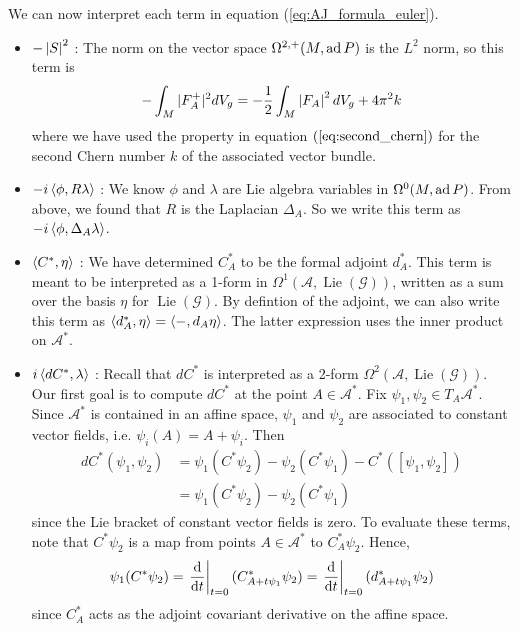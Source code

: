 We can now interpret each term in equation (\ref{eq:AJ_formula_euler}).
\begin{itemize}[leftmargin=\parindent]
    \item 
$-\abs{S}^2$ : The norm on the vector space $\Omega^{2,+}(M,\operatorname{ad} P)$ is the 
$L^2$ norm, so this term is 
\[
	-\int_M \abs[*]{F^+_A}^2 dV_g = -\frac{1}{2}\int_M \abs{F_A}^2 dV_g + 4\pi^2k
\] 
where we have used the property in equation $(\ref{eq:second_chern})$ for the 
second Chern number $k$ of the associated vector bundle.

	\item 
$-i\gen{\phi,R\lambda}$ : We know $\phi$ and  $\lambda$ are Lie algebra
variables in  $\Omega^0(M,\operatorname{ad} P)$. From above, we found that  $R$ is the
Laplacian $\Delta_A$. So we write this term as  
$-i\gen{\phi,\Delta_A\lambda}$. 

	\item 
$\gen{C^*,\eta}$ : We have determined $C_A^*$ to be the formal adjoint $d_A^*$. 
This term is meant to be interpreted as a 1-form in
$\Omega^1(\mathcal{A},\operatorname{Lie}(\mathcal{G}))$, written as a sum over
the basis $\eta$ for $\operatorname{Lie}(\mathcal{G})$. By defintion of the
adjoint, we can also write this term as $\gen{d_A^*,\eta}=\gen{-,d_A\eta}$. 
The latter expression uses the inner product on $\mathcal{A}^*$. 

	\item 
$i\gen{dC^*,\lambda}$ : Recall that $dC^*$ is interpreted as a 2-form 
$\Omega^2(\mathcal{A},\operatorname{Lie}(\mathcal{G}))$. Our first goal is to
compute $dC^*$ at the point $A \in \mathcal{A}^*$. 
Fix $\psi_1,\psi_2\in T_A \mathcal{A}^*$. 
Since $\mathcal{A}^*$ is contained in an affine space, 
$\psi_1$ and $\psi_2$ are associated to constant vector fields, i.e.
$\psi_i(A)=A+\psi_i$. Then 
\begin{align*}
	dC^*(\psi_1,\psi_2) 
	&= \psi_1(C^*\psi_2) - \psi_2(C^*\psi_1) - C^*([\psi_1,\psi_2]) \\
	&= \psi_1(C^*\psi_2) - \psi_2(C^*\psi_1) 
\end{align*}
since the Lie bracket of constant vector fields is zero. To evaluate these
terms, note that $C^*\psi_2$ is a map from points $A\in \mathcal{A}^*$ to 
$C^*_A\psi_2$. Hence,
\begin{align*}
	\psi_1(C^*\psi_2) 
	= \odv{}{t}_{t=0}(C^*_{A+t\psi_1}\psi_2) 
	= \odv{}{t}_{t=0}(d^*_{A+t\psi_1}\psi_2) 
\end{align*}
since $C_A^*$ acts as the adjoint covariant
derivative on the affine space.



\end{itemize}

